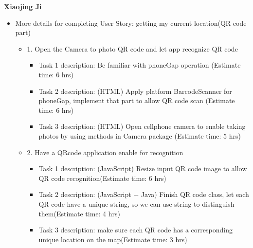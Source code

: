 \documentclass[12pt]{article}
\begin{document}
\textbf{Xiaojing Ji}
\begin{itemize}
\item More details for completing User Story: getting my current location(QR code part)

  \begin{itemize}
         \item 1. Open the Camera to photo QR code and let app recognize QR code

	  \begin{itemize}  
	    \renewcommand{\labelitemii}{-}
	     \item Task 1 description: Be familiar with phoneGap operation (Estimate time: 6 hrs)
	     \item Task 2 description: (HTML) Apply platform BarcodeScanner for phoneGap, implement that part to allow QR code scan (Estimate time: 6 hrs)
	     \item Task 3 description: (HTML) Open cellphone camera to enable taking photos by using methods in Camera package (Estimate time: 5 hrs)
	\end{itemize}

         \item 2. Have a QRcode application enable for recognition

	\begin{itemize}
	  \renewcommand{\labelitemii}{-}
   	   \item Task 1 description: (JavaScript) Resize input QR code image to allow QR code recognition(Estimate time: 6 hrs) 
	   \item Task 2 description: (JavaScript + Java) Finish QR code class, let each QR code have a unique string, so we can use string to distinguish them(Estimate time: 4 hrs)
   \item Task 3 description: make sure each QR code has a corresponding unique location on the map(Estimate time: 3 hrs)
	\end{itemize}

   \end{itemize}

\end{itemize}
\end{document}
